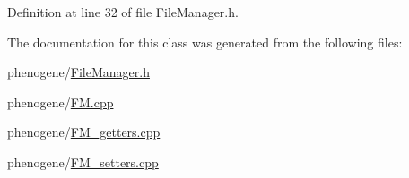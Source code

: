 Definition at line 32 of file File\-Manager.\-h.



The documentation for this class was generated from the following files\-:\begin{DoxyCompactItemize}
\item 
phenogene/\hyperlink{a00004}{File\-Manager.\-h}\item 
phenogene/\hyperlink{a00005}{F\-M.\-cpp}\item 
phenogene/\hyperlink{a00006}{F\-M\-\_\-getters.\-cpp}\item 
phenogene/\hyperlink{a00007}{F\-M\-\_\-setters.\-cpp}\end{DoxyCompactItemize}
